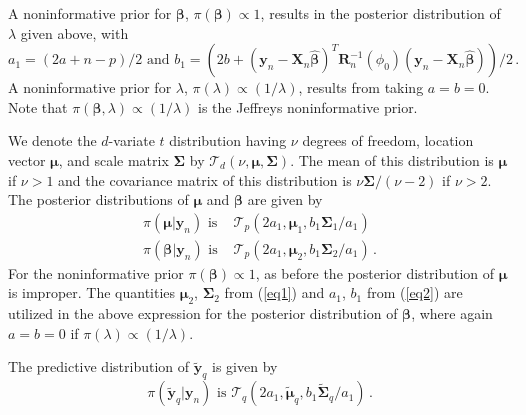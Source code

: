 \documentclass[11pt, oneside]{article}   	%
\begin{document}
A noninformative prior for $\mathbf{\beta}$, $\pi(\mathbf{\beta}) \propto 1$, results in the posterior distribution of $\lambda$ given above, with
\begin{equation}
a_1 = (2a+n-p)/2 \mbox{ and } b_1 = \left( 2b + (\mathbf{y}_n-\mathbf{X}_n \hat{\mathbf{\beta}})^T \mathbf{R}_n^{-1} (\phi_0) (\mathbf{y}_n - \mathbf{X}_n \hat{\mathbf{\beta}}) \right)/2 \,.
\label{eq2}
\end{equation}
A noninformative prior for $\lambda$, $\pi(\lambda) \propto (1/\lambda)$, results from taking $a = b = 0$.  Note that $\pi(\mathbf{\beta}, \lambda) \propto (1/\lambda)$ is the Jeffreys noninformative prior.

We denote the $d$-variate $t$ distribution having $\nu$ degrees of freedom, location vector $\mathbf{\mu}$, and scale matrix $\mathbf{\Sigma}$ by $\mathcal{T}_d (\nu, \mathbf{\mu}, \mathbf{\Sigma})$.  The mean of this distribution is $\mathbf{\mu}$ if $\nu > 1$ and the covariance matrix of this distribution is $\nu \mathbf{\Sigma} / (\nu -2)$ if $\nu > 2$.  The posterior distributions of $\mathbf{\mu}$ and $\mathbf{\beta}$ are given by
\begin{align*}
\pi( \mathbf{\mu} | \mathbf{y}_n ) \mbox{ is } & \mathcal{T}_p \left( 2 a_1, \mathbf{\mu}_1, b_1 \mathbf{\Sigma}_1 / a_1 \right) \\[1ex]
\pi( \mathbf{\beta} | \mathbf{y}_n ) \mbox{ is } & \mathcal{T}_p \left( 2 a_1, \mathbf{\mu}_2, b_1 \mathbf{\Sigma}_2 / a_1 \right) \,.
\end{align*}
For the noninformative prior $\pi(\mathbf{\beta}) \propto 1$, as before the posterior distribution of $\mathbf{\mu}$ is improper.  The quantities $\mathbf{\mu}_2$, $\mathbf{\Sigma}_2$ from (\ref{eq1}) and $a_1$, $b_1$ from (\ref{eq2}) are utilized in the above expression for the posterior distribution of $\mathbf{\beta}$, where again $a = b = 0$ if $\pi(\lambda) \propto (1/\lambda)$.

The predictive distribution of $\tilde{\mathbf{y}}_q$ is given by
\[
\pi( \tilde{\mathbf{y}}_q | \mathbf{y}_n ) \mbox{ is } \mathcal{T}_q \left( 2 a_1, \tilde{\mathbf{\mu}}_q, b_1 \tilde{\mathbf{\Sigma}}_q / a_1 \right) \,.
\] 
\end{document}
